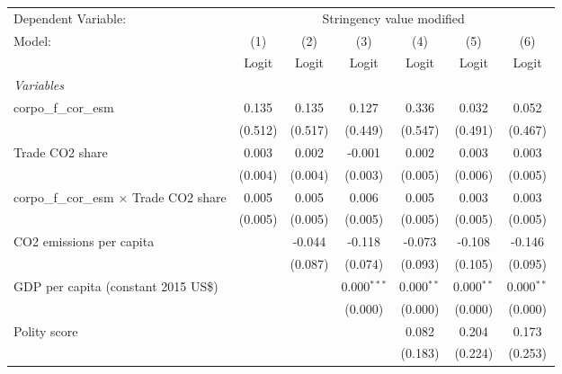 
\begingroup
\centering
\begin{tabular}{lcccccc}
   \toprule
   Dependent Variable: & \multicolumn{6}{c}{Stringency value modified}\\
   Model:                                          & (1)     & (2)     & (3)           & (4)          & (5)          & (6)\\  
                                                   &  Logit  & Logit   & Logit         & Logit        & Logit        & Logit\\  
   \midrule
   \emph{Variables}\\
   corpo\_f\_cor\_esm                              & 0.135   & 0.135   & 0.127         & 0.336        & 0.032        & 0.052\\   
                                                   & (0.512) & (0.517) & (0.449)       & (0.547)      & (0.491)      & (0.467)\\   
   Trade CO2 share                                 & 0.003   & 0.002   & -0.001        & 0.002        & 0.003        & 0.003\\   
                                                   & (0.004) & (0.004) & (0.003)       & (0.005)      & (0.006)      & (0.005)\\   
   corpo\_f\_cor\_esm $\times$ Trade CO2 share     & 0.005   & 0.005   & 0.006         & 0.005        & 0.003        & 0.003\\   
                                                   & (0.005) & (0.005) & (0.005)       & (0.005)      & (0.005)      & (0.005)\\   
   CO2 emissions per capita                        &         & -0.044  & -0.118        & -0.073       & -0.108       & -0.146\\   
                                                   &         & (0.087) & (0.074)       & (0.093)      & (0.105)      & (0.095)\\   
   GDP per capita (constant 2015 US\$)             &         &         & 0.000$^{***}$ & 0.000$^{**}$ & 0.000$^{**}$ & 0.000$^{**}$\\   
                                                   &         &         & (0.000)       & (0.000)      & (0.000)      & (0.000)\\   
   Polity score                                    &         &         &               & 0.082        & 0.204        & 0.173\\   
                                                   &         &         &               & (0.183)      & (0.224)      & (0.253)\\   

\end{tabular}
